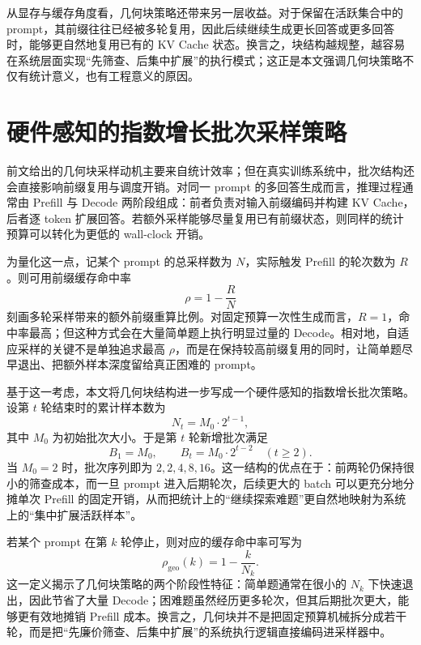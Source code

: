 从显存与缓存角度看，几何块策略还带来另一层收益。对于保留在活跃集合中的 prompt，其前缀往往已经被多轮复用，因此后续继续生成更长回答或更多回答时，能够更自然地复用已有的 KV Cache 状态。换言之，块结构越规整，越容易在系统层面实现“先筛查、后集中扩展”的执行模式；这正是本文强调几何块策略不仅有统计意义，也有工程意义的原因。

\section{硬件感知的指数增长批次采样策略}

前文给出的几何块采样动机主要来自统计效率；但在真实训练系统中，批次结构还会直接影响前缀复用与调度开销。对同一 prompt 的多回答生成而言，推理过程通常由 Prefill 与 Decode 两阶段组成：前者负责对输入前缀编码并构建 KV Cache，后者逐 token 扩展回答。若额外采样能够尽量复用已有前缀状态，则同样的统计预算可以转化为更低的 wall-clock 开销。

为量化这一点，记某个 prompt 的总采样数为 $N$，实际触发 Prefill 的轮次数为 $R$。则可用前缀缓存命中率
\begin{equation}
    \rho = 1 - \frac{R}{N}
\end{equation}
刻画多轮采样带来的额外前缀重算比例。对固定预算一次性生成而言，$R=1$，命中率最高；但这种方式会在大量简单题上执行明显过量的 Decode。相对地，自适应采样的关键不是单独追求最高 $\rho$，而是在保持较高前缀复用的同时，让简单题尽早退出、把额外样本深度留给真正困难的 prompt。

基于这一考虑，本文将几何块结构进一步写成一个硬件感知的指数增长批次策略。设第 $t$ 轮结束时的累计样本数为
\begin{equation}
    N_t = M_0\cdot 2^{t-1},
\end{equation}
其中 $M_0$ 为初始批次大小。于是第 $t$ 轮新增批次满足
\begin{equation}
    B_1=M_0,\qquad B_t=M_0\cdot 2^{t-2}\quad (t\ge 2).
\end{equation}
当 $M_0=2$ 时，批次序列即为 $2,2,4,8,16$。这一结构的优点在于：前两轮仍保持很小的筛查成本，而一旦 prompt 进入后期轮次，后续更大的 batch 可以更充分地分摊单次 Prefill 的固定开销，从而把统计上的“继续探索难题”更自然地映射为系统上的“集中扩展活跃样本”。

若某个 prompt 在第 $k$ 轮停止，则对应的缓存命中率可写为
\begin{equation}
    \rho_{\mathrm{geo}}(k)=1-\frac{k}{N_k}.
\end{equation}
这一定义揭示了几何块策略的两个阶段性特征：简单题通常在很小的 $N_k$ 下快速退出，因此节省了大量 Decode；困难题虽然经历更多轮次，但其后期批次更大，能够更有效地摊销 Prefill 成本。换言之，几何块并不是把固定预算机械拆分成若干轮，而是把“先廉价筛查、后集中扩展”的系统执行逻辑直接编码进采样器中。

